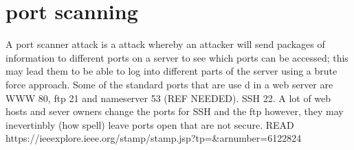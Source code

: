 \section{port scanning}

A port scanner attack is a attack whereby an attacker will send packages of information to different ports on a server to see which ports can be accessed; this may lead them to be able to log into different parts of the server using a brute force approach. Some of the standard ports that are use d in a web server are WWW 80, ftp 21 and nameserver 53 (REF NEEDED). SSH 22. A lot of web hosts and sever owners change the ports for SSH and the ftp however, they may inevertinbly (how spell) leave ports open that are not secure. 
READ https://ieeexplore.ieee.org/stamp/stamp.jsp?tp=&arnumber=6122824